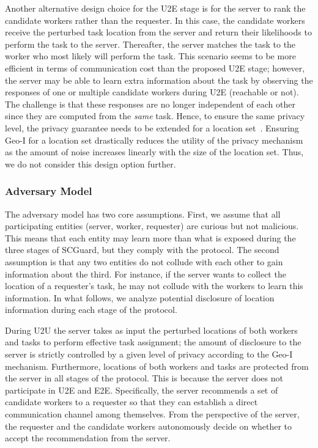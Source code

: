 \documentclass{USC-Thesis}
\newcommand{\SCG}{{SCGuard}}
\numberwithin{equation}{chapter}
\begin{document}
Another alternative design choice for the U2E stage is for the server to rank the candidate workers rather than the requester. In this case, the candidate workers receive the perturbed task location from the server and return their likelihoods to perform the task to the server. Thereafter, the server matches the task to the worker who most likely will perform the task. This scenario seems to be more efficient in terms of communication cost than the proposed U2E stage; however, the server may be able to learn extra information about the task by observing the responses of one or multiple candidate workers during U2E (reachable or not). The challenge is that these responses are no longer independent of each other since they are computed from the \emph{same} task. Hence, to ensure the same privacy level, the privacy guarantee needs to be extended for a location set~\cite{andres2013geo}. Ensuring Geo-I for a location set drastically reduces the utility of the privacy mechanism as the amount of noise increases linearly with the size of the location set. Thus, we do not consider this design option further.

\subsubsection{Adversary Model}

The adversary model has two core assumptions. First, we assume that all participating entities (server, worker, requester) are curious but not malicious. This means that each entity may learn more than what is exposed during the three stages of \SCG, but they comply with the protocol. The second assumption is that any two entities do not collude with each other to gain information about the third. For instance, if the server wants to collect the location of a requester's task, he may not collude with the workers to learn this information. In what follows, we analyze potential disclosure of location information during each stage of the protocol.

During U2U the server takes as input the perturbed locations of both workers and tasks to perform effective task assignment; the amount of disclosure to the server is strictly controlled by a given level of privacy according to the Geo-I mechanism. Furthermore, locations of both workers and tasks are protected from the server in all stages of the protocol. This is because the server does not participate in U2E and E2E. Specifically, the server recommends a set of candidate workers to a requester so that they can establish a direct communication channel among themselves. From the perspective of the server, the requester and the candidate workers autonomously decide on whether to accept the recommendation from the server.
\end{document}
